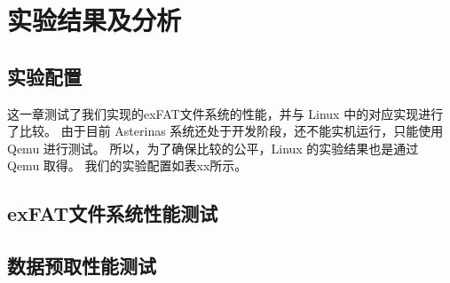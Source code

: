 
\chapter{实验结果及分析}
\section{实验配置}
这一章测试了我们实现的exFAT文件系统的性能，并与 Linux 中的对应实现进行了比较。
由于目前 Asterinas 系统还处于开发阶段，还不能实机运行，只能使用 Qemu 进行测试。
所以，为了确保比较的公平，Linux 的实验结果也是通过 Qemu 取得。
我们的实验配置如表xx所示。


\section{exFAT文件系统性能测试}

\section{数据预取性能测试}
